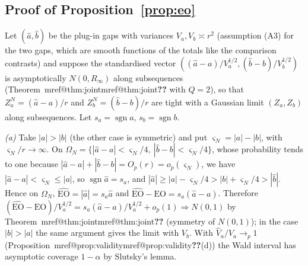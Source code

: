 \documentclass[pdflatex,sn-mathphys-num,iicol]{sn-jnl}
\makeatletter
\theoremstyle{thmstyleone}
\theoremstyle{thmstyletwo}
\theoremstyle{thmstylethree}
\newcommand{\Mref}[1]{\ifcsname mref@#1\endcsname\csname mref@#1\endcsname\else\textbf{??}\fi}
\makeatother
\begin{document}
\subsection{Proof of Proposition~\ref{prop:eo}}\label{si:testing-eo}

Let $(\hat a,\hat b)$ be the plug-in gaps with variances $V_a,V_b\asymp r^2$ (assumption (A3) for the two gaps, which are smooth functions of the totals like the comparison contrasts) and suppose the standardised vector $((\hat a-a)/V_a^{1/2},(\hat b-b)/V_b^{1/2})$ is asymptotically $N(0,R_\infty)$ along subsequences (Theorem~\Mref{thm:joint} with $Q=2$), so that $Z^N_a=(\hat a-a)/r$ and $Z_b^N=(\hat b-b)/r$ are tight with a Gaussian limit $(Z_a,Z_b)$ along subsequences. Let $s_a=\operatorname{sgn}a$, $s_b=\operatorname{sgn}b$.

\emph{(a)} Take $|a|>|b|$ (the other case is symmetric) and put $\varsigma_N=|a|-|b|$, with $\varsigma_N/r\to\infty$. On $\Omega_N=\{|\hat a-a|<\varsigma_N/4,\ |\hat b-b|<\varsigma_N/4\}$, whose probability tends to one because $|\hat a-a|+|\hat b-b|=O_p(r)=o_p(\varsigma_N)$, we have $|\hat a-a|<\varsigma_N\le|a|$, so $\operatorname{sgn}\hat a=s_a$, and $|\hat a|\ge|a|-\varsigma_N/4>|b|+\varsigma_N/4>|\hat b|$. Hence on $\Omega_N$, $\widehat{\mathrm{EO}}=|\hat a|=s_a\hat a$ and $\widehat{\mathrm{EO}}-\mathrm{EO}=s_a(\hat a-a)$. Therefore $(\widehat{\mathrm{EO}}-\mathrm{EO})/V_a^{1/2}=s_a(\hat a-a)/V_a^{1/2}+o_p(1)\Rightarrow N(0,1)$ by Theorem~\Mref{thm:joint} (symmetry of $N(0,1)$); in the case $|b|>|a|$ the same argument gives the limit with $V_b$. With $\hat V_a/V_a\to_p1$ (Proposition~\Mref{prop:validity}(d)) the Wald interval has asymptotic coverage $1-\alpha$ by Slutsky's lemma.
\end{document}
